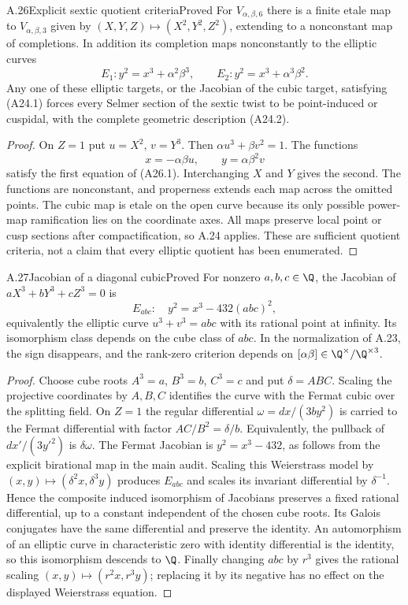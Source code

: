 \begin{statement}{A.26}{Explicit sextic quotient criteria}{Proved}
For $V_{\alpha,\beta,6}$ there is a finite etale map to $V_{\alpha,\beta,3}$ given by $(X,Y,Z)\mapsto(X^2,Y^2,Z^2)$, extending to a nonconstant map of completions. In addition its completion maps nonconstantly to the elliptic curves
\[
E_1:y^2=x^3+\alpha^2\beta^3,
\qquad E_2:y^2=x^3+\alpha^3\beta^2.
\tag{A26.1}
\]
Any one of these elliptic targets, or the Jacobian of the cubic target, satisfying (A24.1) forces every Selmer section of the sextic twist to be point-induced or cuspidal, with the complete geometric description (A24.2).
\end{statement}
\begin{proof}
On $Z=1$ put $u=X^2$, $v=Y^3$. Then $\alpha u^3+\beta v^2=1$. The functions
\[
x=-\alpha\beta u,\qquad y=\alpha\beta^2v
\]
satisfy the first equation of (A26.1). Interchanging $X$ and $Y$ gives the second. The functions are nonconstant, and properness extends each map across the omitted points. The cubic map is etale on the open curve because its only possible power-map ramification lies on the coordinate axes. All maps preserve local point or cusp sections after compactification, so A.24 applies. These are sufficient quotient criteria, not a claim that every elliptic quotient has been enumerated.
\end{proof}

\begin{statement}{A.27}{Jacobian of a diagonal cubic}{Proved}
For nonzero $a,b,c\in\Q$, the Jacobian of $aX^3+bY^3+cZ^3=0$ is
\[
E_{abc}:\quad y^2=x^3-432(abc)^2,
\]
equivalently the elliptic curve $u^3+v^3=abc$ with its rational point at infinity. Its isomorphism class depends on the cube class of $abc$. In the normalization of A.23, the sign disappears, and the rank-zero criterion depends on $[\alpha\beta]\in\Q^\times/\Q^{\times3}$.
\end{statement}
\begin{proof}
Choose cube roots $A^3=a$, $B^3=b$, $C^3=c$ and put $\delta=ABC$. Scaling the projective coordinates by $A,B,C$ identifies the curve with the Fermat cubic over the splitting field. On $Z=1$ the regular differential $\omega=dx/(3by^2)$ is carried to the Fermat differential with factor $AC/B^2=\delta/b$. Equivalently, the pullback of $dx'/(3y'^2)$ is $\delta\omega$. The Fermat Jacobian is $y^2=x^3-432$, as follows from the explicit birational map in the main audit. Scaling this Weierstrass model by $(x,y)\mapsto(\delta^2x,\delta^3y)$ produces $E_{abc}$ and scales its invariant differential by $\delta^{-1}$. Hence the composite induced isomorphism of Jacobians preserves a fixed rational differential, up to a constant independent of the chosen cube roots. Its Galois conjugates have the same differential and preserve the identity. An automorphism of an elliptic curve in characteristic zero with identity differential is the identity, so this isomorphism descends to $\Q$. Finally changing $abc$ by $r^3$ gives the rational scaling $(x,y)\mapsto(r^2x,r^3y)$; replacing it by its negative has no effect on the displayed Weierstrass equation.
\end{proof}

